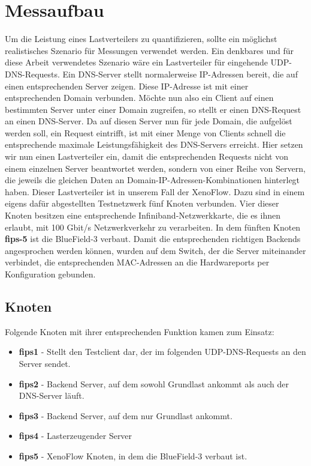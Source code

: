 \section{Messaufbau}
Um die Leistung eines Lastverteilers zu quantifizieren, sollte ein möglichst realistisches Szenario für Messungen verwendet werden. Ein denkbares und für diese Arbeit verwendetes Szenario wäre ein Lastverteiler für eingehende UDP-DNS-Requests. Ein DNS-Server stellt normalerweise IP-Adressen bereit, die auf einen entsprechenden Server zeigen. Diese IP-Adresse ist mit einer entsprechenden Domain verbunden. Möchte nun also ein Client auf einen bestimmten Server unter einer Domain zugreifen, so stellt er einen DNS-Request an einen DNS-Server. Da auf diesen Server nun für jede Domain, die aufgelöst werden soll, ein Request eintrifft, ist mit einer Menge von Clients schnell die entsprechende maximale Leistungsfähigkeit des DNS-Servers erreicht. Hier setzen wir nun einen Lastverteiler ein, damit die entsprechenden Requests nicht von einem einzelnen Server beantwortet werden, sondern von einer Reihe von Servern, die jeweils die gleichen Daten an Domain-IP-Adressen-Kombinationen hinterlegt haben. Dieser Lastverteiler ist in unserem Fall der XenoFlow. Dazu sind in einem eigens dafür abgestellten Testnetzwerk fünf Knoten verbunden. Vier dieser Knoten besitzen eine entsprechende Infiniband-Netzwerkkarte, die es ihnen erlaubt, mit 100 Gbit/s Netzwerkverkehr zu verarbeiten. In dem fünften Knoten \textbf{fips-5} ist die BlueField-3 verbaut. Damit die entsprechenden richtigen Backends angesprochen werden können, wurden auf dem Switch, der die Server miteinander verbindet, die entsprechenden MAC-Adressen an die Hardwareports per Konfiguration gebunden.
\subsection{Knoten}
Folgende Knoten mit ihrer entsprechenden Funktion kamen zum Einsatz:
\begin{itemize}
    \item \textbf{fips1} - Stellt den Testclient dar, der im folgenden UDP-DNS-Requests an den Server sendet.
    \item \textbf{fips2} - Backend Server, auf dem sowohl Grundlast ankommt als auch der DNS-Server läuft.
    \item \textbf{fips3} - Backend Server, auf dem nur Grundlast ankommt.
    \item \textbf{fips4} - Lasterzeugender Server
    \item \textbf{fips5} - XenoFlow Knoten, in dem die BlueField-3 verbaut ist.
\end{itemize}
